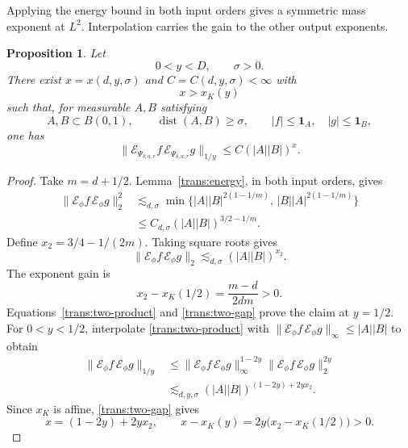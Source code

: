 \documentclass[11pt]{article}
\numberwithin{equation}{section}
\newtheorem{proposition}[theorem]{Proposition}
\newcommand{\norm}[1]{\lVert #1\rVert}
\newcommand{\dist}{\operatorname{dist}}
\begin{document}
Applying the energy bound in both input orders gives a symmetric
mass exponent at \(L^2\). Interpolation carries the gain to the
other output exponents.

\begin{proposition}\label{trans:restricted}
Let
\[
 0<y<D,\qquad \sigma>0.
\]
There exist \(x=x(d,y,\sigma)\) and \(C=C(d,y,\sigma)<\infty\) with
\[
 x>x_K(y)
\]
such that, for measurable \(A,B\) satisfying
\[
 A,B\subset B(0,1),\qquad \dist(A,B)\geq\sigma,\qquad
 |f|\leq\mathbf1_A,\quad |g|\leq\mathbf1_B,
\]
one has
\[
 \norm{\mathcal E_{\Psi_{\delta,a,r}}f\,
       \mathcal E_{\Psi_{\delta,a,r}}g}_{1/y}
 \leq C(|A||B|)^x.
\]
\end{proposition}

\begin{proof}
Take \(m=d+1/2\). Lemma~\ref{trans:energy}, in both input orders,
gives
\begin{align*}
 \norm{\mathcal E_\phi f\,\mathcal E_\phi g}_2^2
 &\lesssim_{d,\sigma}
   \min\{|A||B|^{2(1-1/m)},\,|B||A|^{2(1-1/m)}\}\\
 &\leq C_{d,\sigma}(|A||B|)^{3/2-1/m}.
\end{align*}
Define \(x_2=3/4-1/(2m)\). Taking square roots gives
\begin{equation}\label{trans:two-product}
 \norm{\mathcal E_\phi f\,\mathcal E_\phi g}_2
 \lesssim_{d,\sigma}(|A||B|)^{x_2}.
\end{equation}
The exponent gain is
\begin{equation}\label{trans:two-gap}
 x_2-x_K(1/2)=\frac{m-d}{2dm}>0.
\end{equation}
Equations~\eqref{trans:two-product} and \eqref{trans:two-gap}
prove the claim at \(y=1/2\).
For \(0<y<1/2\), interpolate \eqref{trans:two-product} with
\(\norm{\mathcal E_\phi f\,\mathcal E_\phi g}_\infty\leq|A||B|\)
to obtain
\begin{align*}
 \norm{\mathcal E_\phi f\,\mathcal E_\phi g}_{1/y}
 &\leq
   \norm{\mathcal E_\phi f\,\mathcal E_\phi g}_\infty^{1-2y}
   \norm{\mathcal E_\phi f\,\mathcal E_\phi g}_2^{2y}\\
 &\lesssim_{d,y,\sigma}(|A||B|)^{(1-2y)+2yx_2}.
\end{align*}
Since \(x_K\) is affine, \eqref{trans:two-gap} gives
\[
 x=(1-2y)+2yx_2,\qquad
 x-x_K(y)=2y\bigl(x_2-x_K(1/2)\bigr)>0.
\]


\end{proof}
\end{document}
